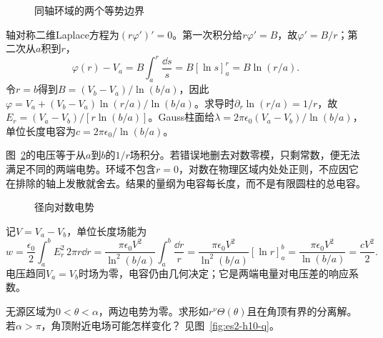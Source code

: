 \begin{figure}[H]\centering
{}
\caption{同轴环域的两个等势边界}\label{fig:es2-h9-q}
\end{figure}
\begin{solution}
轴对称二维Laplace方程为$(r\varphi')'=0$。第一次积分给$r\varphi'=B$，故$\varphi'=B/r$；第二次从$a$积到$r$，
\[\varphi(r)-V_a=B\int_a^r\frac{\dd s}s=B[\ln s]_a^r=B\ln(r/a).\]
令$r=b$得到$B=(V_b-V_a)/\ln(b/a)$，因此$\varphi=V_a+(V_b-V_a)\ln(r/a)/\ln(b/a)$。求导时$\partial_r\ln(r/a)=1/r$，故$E_r=(V_a-V_b)/[r\ln(b/a)]$。Gauss柱面给$\lambda=2\pi\epsilon_0(V_a-V_b)/\ln(b/a)$，单位长度电容为$c=2\pi\epsilon_0/\ln(b/a)$。

图~\ref{fig:es2-h9-s}的电压等于从$a$到$b$的$1/r$场积分。若错误地删去对数零模，只剩常数，便无法满足不同的两端电势。环域不包含$r=0$，对数在物理区域内处处正则，不应因它在排除的轴上发散就舍去。结果的量纲为电容每长度，而不是有限圆柱的总电容。
\begin{figure}[H]\centering
{}
\caption{径向对数电势}\label{fig:es2-h9-s}
\end{figure}


记$V=V_a-V_b$，单位长度场能为
\[w=\frac{\epsilon_0}2\int_a^bE_r^2\,2\pi r\dd r
=\frac{\pi\epsilon_0V^2}{\ln^2(b/a)}\int_a^b\frac{\dd r}r
=\frac{\pi\epsilon_0V^2}{\ln^2(b/a)}[\ln r]_a^b
=\frac{\pi\epsilon_0V^2}{\ln(b/a)}=\frac{cV^2}2.\]
电压趋同$V_a=V_b$时场为零，电容仍由几何决定；它是两端电量对电压差的响应系数。
\end{solution}

\begin{exercise}[楔形区域的允许指数]\label{ex:es2-h10}
无源区域为$0<\theta<\alpha$，两边电势为零。求形如$r^\nu\Theta(\theta)$且在角顶有界的分离解。若$\alpha>\pi$，角顶附近电场可能怎样变化？ 见图~\ref{fig:es2-h10-q}。
\end{exercise}

